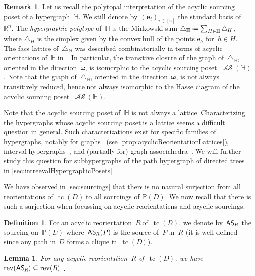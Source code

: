 \documentclass{amsart}
\newtheorem{lemma}[theorem]{Lemma}
\theoremstyle{definition}
\newtheorem{definition}[theorem]{Definition}
\newtheorem{remark}[theorem]{Remark}
\newcommand{\R}{\mathbb{R}} %
\renewcommand{\b}[1]{\boldsymbol{#1}} %
\newcommand{\eqdef}{\mbox{\,\raisebox{0.2ex}{\scriptsize\ensuremath{\mathrm:}}\ensuremath{=}\,}} %
\newcommand{\simplex}{\triangle} %
\DeclareMathOperator{\tc}{tc} %
\newcommand{\darkblue}{\color{darkblue}} %
\newcommand{\defn}[1]{\textsl{\darkblue #1}} %
\newcommand{\mymap}[2]{\mathsf{#1}_{\hspace{-.7pt}#2}}
\DeclareMathOperator{\rev}{rev} %
\DeclareMathOperator{\ASour}{\mathcal{AS}}  %
\newcommand{\asour}[1]{\mymap{AS}{#1}}  %
\newcommand{\HH}{\mathbb H}  %
\newcommand{\PP}{\mathbb P} %
\begin{document}
\begin{remark}
Let us recall the polytopal interpretation of the acyclic sourcing poset of a hypergraph~$\HH$.
We still denote by~$(\b{e}_i)_{i \in [n]}$ the standard basis of~$\R^n$.
The \defn{hypergraphic polytope} of~$\HH$ is the Minkowski sum
\(
\simplex_\HH \eqdef \sum_{H\in \HH} \simplex_H\,,
\)
where $\simplex_H$ is the simplex given by the convex hull of the points $\b{e}_h$ for~$h \in H$.
The face lattice of~$\simplex_\HH$ was described combinatorially in terms of acyclic orientations of~$\HH$ in~\cite{BenedettiBergeronMachacek}.
In particular, the transitive closure of the graph of~$\simplex_\HH$, oriented in the direction~$\b{\omega}$, is isomorphic to the acyclic sourcing poset~$\ASour(\HH)$.
Note that the graph of~$\simplex_\HH$, oriented in the direction~$\b{\omega}$, is not always transitively reduced, hence not always isomorphic to the Hasse diagram of the acyclic sourcing poset~$\ASour(\HH)$.
\end{remark}

Note that the acyclic sourcing poset of~$\HH$ is not always a lattice.
Characterizing the hypergraphs whose acyclic sourcing poset is a lattice seems a difficult question in general.
Such characterizations exist for specific families of hypergraphs, notably for graphs~\cite{Pilaud-acyclicReorientationLattices} (see \cref{prop:acyclicReorientationLattices}), interval hypergraphs~\cite{BergeronPilaud}, and (partially for) graph associahedra~\cite{BarnardMcConville}.
We will further study this question for subhypergraphs of the path hypergraph of directed trees in \cref{sec:intreevalHypergraphicPosets}.

We have observed in \cref{sec:sourcings} that there is no natural surjection from all reorientations of~$\tc(D)$ to all sourcings of~$\PP(D)$.
We now recall that there is such a surjection when focussing on acyclic reorientations and acyclic sourcings.

\begin{definition}
\label{def:AReori2ASour}
For an acyclic reorientation~$R$ of~$\tc(D)$, we denote by~$\asour{R}$ the sourcing on~$\PP(D)$ where~$\asour{R}(P)$ is the source of~$P$ in~$R$ (it is well-defined since any path in~$D$ forms a clique in~$\tc(D)$).
\end{definition}

\begin{lemma}
\label{lem:AReori2ASour1}
For any acyclic reorientation~$R$ of~$\tc(D)$, we have~$\rev(\asour{R}) \subseteq \rev(R)$ .
\end{lemma}
\end{document}
